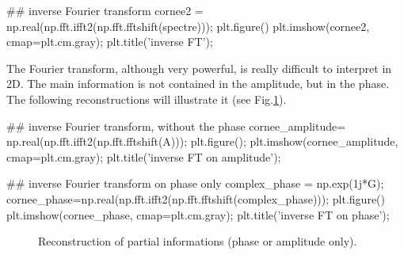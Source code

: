 \begin{python}
## inverse Fourier transform
cornee2 = np.real(np.fft.ifft2(np.fft.fftshift(spectre)));
plt.figure()
plt.imshow(cornee2, cmap=plt.cm.gray);
plt.title('inverse FT');
\end{python}

The Fourier transform, although very powerful, is really difficult to interpret in 2D. The main information is not contained in the amplitude, but in the phase. The following reconstructions will illustrate it (see Fig.\ref{fig:partial}).

\begin{python}
## inverse Fourier transform, without the phase
cornee_amplitude=  np.real(np.fft.ifft2(np.fft.fftshift(A)));
plt.figure();
plt.imshow(cornee_amplitude, cmap=plt.cm.gray);
plt.title('inverse FT on amplitude');
\end{python}

\begin{python}
## inverse Fourier transform on phase only
complex_phase = np.exp(1j*G);
cornee_phase=np.real(np.fft.ifft2(np.fft.fftshift(complex_phase)));
plt.figure()
plt.imshow(cornee_phase, cmap=plt.cm.gray);
plt.title('inverse FT on phase');
\end{python}

\begin{figure}[htbp]
 \centering\caption{Reconstruction of partial informations (phase or amplitude only).}%
 \hfill
 \label{fig:partial}%
\end{figure}


